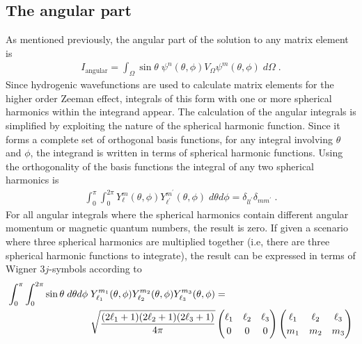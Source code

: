         \subsection{The angular part} \label{sec:The_Angular_Part}
        As mentioned previously, the angular part of the solution to any matrix element is
        \begin{align}
            I_{\text{angular}} = \int_\Omega \sin \theta \; \psi^n(\theta, \phi) V_\Omega \psi^m(\theta, \phi) \; d\Omega\;. \label{eq:hydrogen_spherical_harmonic}
        \end{align}
        \noindent Since hydrogenic wavefunctions are used to calculate matrix elements for the higher order Zeeman effect, integrals of this form with one or more spherical harmonics within the integrand appear. The calculation of the angular integrals is simplified by exploiting the nature of the spherical harmonic function. Since it forms a complete set of orthogonal basis functions, for any integral involving $\theta$ and $\phi$, the integrand is written in terms of spherical harmonic functions. Using the orthogonality of the basis functions the integral of any two spherical harmonics is
        \begin{align}
            \int_0^\pi \int_0^{2\pi} Y^m_\ell(\theta, \phi) Y^{m^\prime}_{\ell^\prime} (\theta, \phi) \; d\theta d\phi = \delta_{ll^\prime} \delta_{mm^\prime}\label{eq:delta_spherical_harmonic}\;.
        \end{align}
        \noindent For all angular integrals where the spherical harmonics contain different angular momentum or magnetic quantum numbers, the result is zero. If given a scenario where three spherical harmonics are multiplied together (i.e, there are three spherical harmonic functions to integrate), the result can be expressed in terms of Wigner $3j$-symbols according to \cite{edmonds_book}
        \begin{align}
            \int_0^\pi \int_0^{2\pi} \sin \theta \; d\theta d\phi\;& Y^{m_1}_{{\ell_1}}(\theta, \phi) Y^{m_2}_{{\ell_2}} (\theta, \phi) Y^{m_3}_{{\ell_3}} (\theta, \phi) =\\
             &\sqrt{\frac{(2\ell_1 + 1)(2\ell_2 + 1) (2\ell_3 + 1)}{4 \pi}} 
             \renewcommand{\arraystretch}{1.2}\begin{pmatrix} \ell_1 & \ell_2 & \ell_3 \\ 0 & 0 & 0 \end{pmatrix}
             \renewcommand{\arraystretch}{1.2}\begin{pmatrix} \ell_1 & \ell_2 & \ell_3 \\ m_1 & m_2 & m_3 \end{pmatrix} \nonumber
        \end{align}
